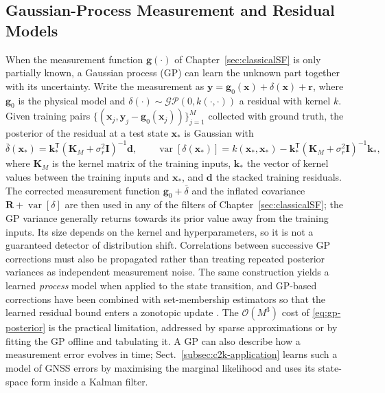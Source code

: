 \subsection{Gaussian-Process Measurement and Residual Models}
\label{subsec:gp-models}
When the measurement function $\mathbf{g}(\cdot)$ of Chapter~\ref{sec:classicalSF} is only partially known, a Gaussian process (GP) \cite{rasmussen2006_gp} can learn the unknown part together with its uncertainty. Write the measurement as $\mathbf{y}=\mathbf{g}_0(\mathbf{x})+\delta(\mathbf{x})+\mathbf{r}$, where $\mathbf{g}_0$ is the physical model and $\delta(\cdot)\sim\mathcal{GP}(0,k(\cdot,\cdot))$ a residual with kernel $k$. Given training pairs $\{(\mathbf{x}_j,\mathbf{y}_j-\mathbf{g}_0(\mathbf{x}_j))\}_{j=1}^{M}$ collected with ground truth, the posterior of the residual at a test state $\mathbf{x}_*$ is Gaussian with
\begin{equation}
\bar{\delta}(\mathbf{x}_*)=\mathbf{k}_*^{\mathsf T}(\mathbf{K}_{M}+\sigma_r^{2}\mathbf{I})^{-1}\mathbf{d},\qquad
\operatorname{var}[\delta(\mathbf{x}_*)]=k(\mathbf{x}_*,\mathbf{x}_*)-\mathbf{k}_*^{\mathsf T}(\mathbf{K}_{M}+\sigma_r^{2}\mathbf{I})^{-1}\mathbf{k}_*,
\label{eq:gp-posterior}
\end{equation}
where $\mathbf{K}_{M}$ is the kernel matrix of the training inputs, $\mathbf{k}_*$ the vector of kernel values between the training inputs and $\mathbf{x}_*$, and $\mathbf{d}$ the stacked training residuals. The corrected measurement function $\mathbf{g}_0+\bar{\delta}$ and the inflated covariance $\mathbf{R}+\operatorname{var}[\delta]$ are then used in any of the filters of Chapter~\ref{sec:classicalSF}; the GP variance generally returns towards its prior value away from the training inputs. Its size depends on the kernel and hyperparameters, so it is not a guaranteed detector of distribution shift. Correlations between successive GP corrections must also be propagated rather than treating repeated posterior variances as independent measurement noise. The same construction yields a learned \emph{process} model when applied to the state transition, and GP-based corrections have been combined with set-membership estimators so that the learned residual bound enters a zonotopic update \cite{li2022_gp_zkf}. The $\mathcal{O}(M^{3})$ cost of \eqref{eq:gp-posterior} is the practical limitation, addressed by sparse approximations or by fitting the GP offline and tabulating it. A GP can also describe how a measurement error evolves in time; Sect.~\ref{subsec:c2k-application} learns such a model of GNSS errors by maximising the marginal likelihood and uses its state-space form inside a Kalman filter.


